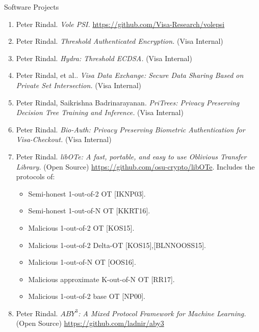 \documentclass{resume} %
\begin{document}
\begin{rSection}{Software Projects}
	
	
	\begin{enumerate}[label=S\arabic* --]
		
		\item Peter Rindal. \emph{Vole PSI.} \url{https://github.com/Visa-Research/volepsi}
		
		\item Peter Rindal. \emph{Threshold Authenticated Encryption.} (Visa Internal)
				
		\item Peter Rindal. \emph{Hydra: Threshold ECDSA.} (Visa Internal)
		
		\item Peter Rindal, et al.. \emph{Visa Data Exchange: Secure Data Sharing Based on Private Set Intersection.} (Visa Internal)
		
		\item Peter Rindal, Saikrishna Badrinarayanan. \emph{PriTrees: Privacy Preserving Decision Tree Training and Inference.} (Visa Internal)
		
		\item Peter Rindal. \emph{Bio-Auth: Privacy Preserving Biometric Authentication for Visa-Checkout.} (Visa Internal)
		
		\item Peter Rindal. \emph{libOTe: A fast, portable, and easy to use Oblivious Transfer Library.}  (Open Source) \url{https://github.com/osu-crypto/libOTe}. Includes the protocols of:
		\begin{itemize}
			\item Semi-honest 1-out-of-2 OT [IKNP03]. 
			\item Semi-honest 1-out-of-N OT [KKRT16].
			\item Malicious 1-out-of-2 OT [KOS15].
			\item Malicious 1-out-of-2 Delta-OT [KOS15],[BLNNOOSS15].
			\item Malicious 1-out-of-N OT [OOS16].
			\item Malicious approximate K-out-of-N OT [RR17].
			\item Malicious 1-out-of-2 base OT [NP00].
			
		\end{itemize}
	
	
		\item  Peter Rindal. \emph{$ABY^3$: A Mixed Protocol Framework for Machine Learning.} (Open Source)  \url{https://github.com/ladnir/aby3}
	

\end{enumerate}
\end{rSection}
\end{document}
